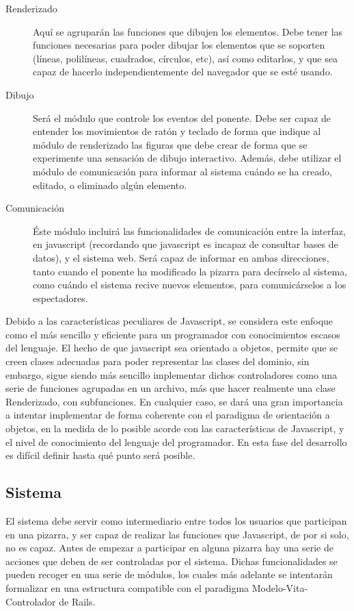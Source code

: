 \begin{description}
	\item[Renderizado] Aquí se agruparán las funciones que dibujen los elementos. Debe tener las funciones necesarias para poder dibujar los elementos que se soporten (líneas, polilíneas, cuadrados, círculos, etc), así como editarlos, y que sea capaz de hacerlo independientemente del navegador que se esté usando.
	\item[Dibujo] Será el módulo que controle los eventos del ponente. Debe ser capaz de entender los movimientos de ratón y teclado de forma que indique al módulo de renderizado las figuras que debe crear de forma que se experimente una sensación de dibujo interactivo. Además, debe utilizar el módulo de comunicación para informar al sistema cuándo se ha creado, editado, o eliminado algún elemento.
	\item[Comunicación] Éste módulo incluirá las funcionalidades de comunicación entre la interfaz, en javascript (recordando que javascript es incapaz de consultar bases de datos), y el sistema web. Será capaz de informar en ambas direcciones, tanto cuando el ponente ha modificado la pizarra para decírselo al sistema, como cuándo el sistema recive nuevos elementos, para comunicárselos a los espectadores.
\end{description}

Debido a las características peculiares de Javascript, se considera este enfoque como el más sencillo y eficiente para un programador con conocimientos escasos del lenguaje. El hecho de que javascript sea orientado a objetos, permite que se creen clases adecuadas para poder representar las clases del dominio, sin embargo, sigue siendo más sencillo implementar dichos controladores como una serie de funciones agrupadas en un archivo, más que hacer realmente una clase Renderizado, con subfunciones. En cualquier caso, se dará una gran importancia a intentar implementar de forma coherente con el paradigma de orientación a objetos, en la medida de lo posible acorde con las características de Javascript, y el nivel de conocimiento del lenguaje del programador. En esta fase del desarrollo es difícil definir hasta qué punto será posible.


\subsection{Sistema}

El sistema debe servir como intermediario entre todos los usuarios que participan en una pizarra, y ser capaz de realizar las funciones que Javascript, de por si solo, no es capaz. Antes de empezar a participar en alguna pizarra hay una serie de acciones que deben de ser controladas por el sistema. Dichas funcionalidades se pueden recoger en una serie de módulos, los cuales más adelante se intentarán formalizar en una estructura compatible con el paradigma Modelo-Vita-Controlador de Rails.

